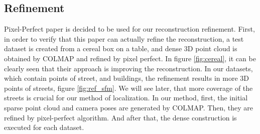\documentclass[11pt]{article}
\begin{document}
    \subsection{Refinement}
    Pixel-Perfect paper \cite{lindenberger2021pixsfm} is decided to be used for our reconstruction refinement.
    First, in order to verify that this paper can actually refine the reconstruction, a test dataset is
    created from a cereal box on a table, and dense 3D point cloud is obtained by COLMAP
    and refined by pixel perfect. In figure \ref{fig:cereal}, it can be clearly seen that their approach is improving the reconstruction.
    In our datasets, which contain points of street, and buildings, the refinement results in more 3D points of streets, figure \ref{fig:ref_sfm}.
    We will see later, that more coverage of the streets is crucial for our method of localization.
    In our method, first, the initial sparse point cloud and camera poses are generated by COLMAP. Then, they are refined
    by pixel-perfect algorithm. And after that, the dense construction is executed for each dataset.
\end{document}
